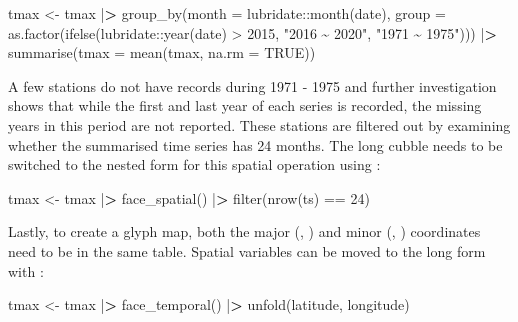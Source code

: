 \documentclass{article}
\newenvironment{Shaded}{\begin{snugshade}}{\end{snugshade}}
\newcommand{\AttributeTok}[1]{\textcolor[rgb]{0.77,0.63,0.00}{#1}}
\newcommand{\ConstantTok}[1]{\textcolor[rgb]{0.00,0.00,0.00}{#1}}
\newcommand{\DecValTok}[1]{\textcolor[rgb]{0.00,0.00,0.81}{#1}}
\newcommand{\ErrorTok}[1]{\textcolor[rgb]{0.64,0.00,0.00}{\textbf{#1}}}
\newcommand{\FunctionTok}[1]{\textcolor[rgb]{0.00,0.00,0.00}{#1}}
\newcommand{\NormalTok}[1]{#1}
\newcommand{\OtherTok}[1]{\textcolor[rgb]{0.56,0.35,0.01}{#1}}
\newcommand{\SpecialCharTok}[1]{\textcolor[rgb]{0.00,0.00,0.00}{#1}}
\newcommand{\StringTok}[1]{\textcolor[rgb]{0.31,0.60,0.02}{#1}}
\begin{document}
\begin{Shaded}
\begin{Highlighting}[]
\NormalTok{tmax }\OtherTok{\textless{}{-}}\NormalTok{ tmax }\SpecialCharTok{|}\ErrorTok{\textgreater{}}
  \FunctionTok{group\_by}\NormalTok{(}\AttributeTok{month =}\NormalTok{ lubridate}\SpecialCharTok{::}\FunctionTok{month}\NormalTok{(date), }
         \AttributeTok{group =} \FunctionTok{as.factor}\NormalTok{(}\FunctionTok{ifelse}\NormalTok{(lubridate}\SpecialCharTok{::}\FunctionTok{year}\NormalTok{(date) }\SpecialCharTok{\textgreater{}} \DecValTok{2015}\NormalTok{, }
                                  \StringTok{"2016 \textasciitilde{} 2020"}\NormalTok{, }\StringTok{"1971 \textasciitilde{} 1975"}\NormalTok{))) }\SpecialCharTok{|}\ErrorTok{\textgreater{}}
  \FunctionTok{summarise}\NormalTok{(}\AttributeTok{tmax =} \FunctionTok{mean}\NormalTok{(tmax, }\AttributeTok{na.rm =} \ConstantTok{TRUE}\NormalTok{))}
\end{Highlighting}
\end{Shaded}

A few stations do not have records during 1971 - 1975 and further investigation shows that while the first and last year of each series is recorded, the missing years in this period are not reported. These stations are filtered out by examining whether the summarised time series has 24 months. The long cubble needs to be switched to the nested form for this spatial operation using :

\begin{Shaded}
\begin{Highlighting}[]
\NormalTok{tmax }\OtherTok{\textless{}{-}}\NormalTok{ tmax }\SpecialCharTok{|}\ErrorTok{\textgreater{}} \FunctionTok{face\_spatial}\NormalTok{() }\SpecialCharTok{|}\ErrorTok{\textgreater{}} \FunctionTok{filter}\NormalTok{(}\FunctionTok{nrow}\NormalTok{(ts) }\SpecialCharTok{==} \DecValTok{24}\NormalTok{) }
\end{Highlighting}
\end{Shaded}

Lastly, to create a glyph map, both the major (, ) and minor (, ) coordinates need to be in the same table. Spatial variables can be moved to the long form with :

\begin{Shaded}
\begin{Highlighting}[]
\NormalTok{tmax }\OtherTok{\textless{}{-}}\NormalTok{ tmax }\SpecialCharTok{|}\ErrorTok{\textgreater{}} \FunctionTok{face\_temporal}\NormalTok{() }\SpecialCharTok{|}\ErrorTok{\textgreater{}} \FunctionTok{unfold}\NormalTok{(latitude, longitude)}
\end{Highlighting}
\end{Shaded}
\end{document}
